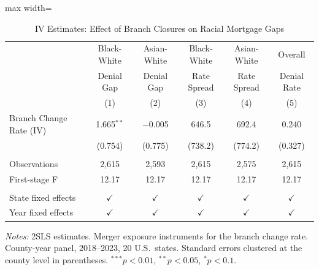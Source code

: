 
\begin{table}[htbp]
   \caption{\label{tab:iv_main} IV Estimates: Effect of Branch Closures on Racial Mortgage Gaps}
   \bigskip
   \centering
   \begin{adjustbox}{max width=\textwidth}
   \begin{tabular}{lccccc}
      \toprule
                                 & Black-White       & Asian-White           & Black-White           & Asian-White           & Overall\\
                                 & Denial Gap        & Denial Gap            & Rate Spread           & Rate Spread           & Denial Rate\\
                                 & (1)               & (2)                   & (3)                   & (4)                   & (5)\\
      \midrule
      Branch Change Rate (IV)    & 1.665$^{**}$      & $-$0.005              & 646.5                 & 692.4                 & 0.240\\
                                 & (0.754)           & (0.775)               & (738.2)               & (774.2)               & (0.327)\\
       \\
      Observations               & 2,615             & 2,593                 & 2,615                 & 2,575                 & 2,615\\
      First-stage F              & 12.17             & 12.17                 & 12.17                 & 12.17                 & 12.17\\
       \\
      State fixed effects        & $\checkmark$      & $\checkmark$          & $\checkmark$          & $\checkmark$          & $\checkmark$\\
      Year fixed effects         & $\checkmark$      & $\checkmark$          & $\checkmark$          & $\checkmark$          & $\checkmark$\\
      \bottomrule
   \end{tabular}
   \end{adjustbox}

   \par \raggedright \small
   \textit{Notes:} 2SLS estimates. Merger exposure instruments for the branch change rate. County-year panel, 2018--2023, 20 U.S.\ states. Standard errors clustered at the county level in parentheses. $^{***}p<0.01$, $^{**}p<0.05$, $^{*}p<0.1$.
\end{table}

